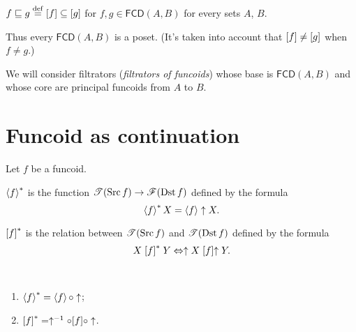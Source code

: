 \begin{defn}
$f\sqsubseteq g\overset{\mathrm{def}}{=}\mathord{\mathrel{\left[f\right]}}\subseteq\mathord{\mathrel{\left[g\right]}}$ for $f,g\in\mathsf{FCD}(A,B)$
for every sets $A$, $B$.
\end{defn}
Thus every $\mathsf{FCD}(A,B)$ is a poset. (It's taken into account
that $\mathord{\mathrel{\left[f\right]}}\ne\mathord{\mathrel{\left[g\right]}}$ when $f\ne g$.)

We will consider filtrators (\emph{filtrators
of funcoids}) whose base is $\mathsf{FCD}(A,B)$ and whose core are
principal funcoids from $A$ to $B$.

\section{Funcoid as continuation}

Let $f$ be a funcoid.
\begin{defn}
$\left\langle f\right\rangle ^{\ast}$ is the function $\mathscr{T}(\operatorname{Src} f)\rightarrow\mathscr{F}(\operatorname{Dst} f)$
defined by the formula
\[
\left\langle f\right\rangle ^{\ast}X=\left\langle f\right\rangle\uparrow X.
\]

\end{defn}

\begin{defn}
$\mathrel{\left[f\right]^{\ast}}$ is the relation between $\mathscr{T}(\operatorname{Src} f)$ and $\mathscr{T}(\operatorname{Dst}
f)$
defined by the formula
\[
X\mathrel{\left[f\right]^{\ast}}Y\Leftrightarrow\uparrow X\mathrel{\left[f\right]}\uparrow Y.
\]
\end{defn}
\begin{obvious}
~
\begin{enumerate}
\item $\left\langle f\right\rangle ^{\ast}=\left\langle f\right\rangle\circ\uparrow$;
\item $\mathord{\mathrel{\left[f\right]^{\ast}}}=\uparrow^{-1}\circ\mathord{\mathrel{\left[f\right]}}\circ\uparrow$.
\end{enumerate}
\end{obvious}

